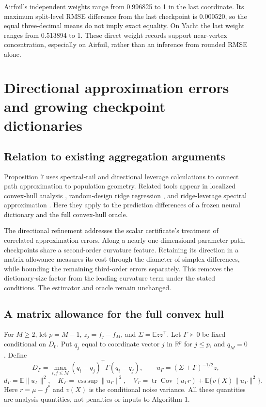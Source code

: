 \documentclass[pdflatex,sn-mathphys-ay]{sn-jnl}
\theoremstyle{remark}\newtheorem{remark}[theorem]{Remark}
\newcommand{\E}{\mathbb E}
\newcommand{\R}{\mathbb R}
\newcommand{\tr}{\operatorname{tr}}
\begin{document}
Airfoil's independent weights range from 0.996825 to 1 in the last coordinate. Its maximum split-level RMSE difference from the last checkpoint is 0.000520, so the equal three-decimal means do not imply exact equality. On Yacht the last weight ranges from 0.513894 to 1. These direct weight records support near-vertex concentration, especially on Airfoil, rather than an inference from rounded RMSE alone.

\section{Directional approximation errors and growing checkpoint dictionaries}\label{sec:directional}
\subsection{Relation to existing aggregation arguments}
Proposition 7 uses spectral-tail and directional leverage calculations to connect path approximation to population geometry. Related tools appear in localized convex-hull analysis \citep{belleclocal}, random-design ridge regression \citep{hsu}, and ridge-leverage spectral approximation \citep{cohen}. Here they apply to the prediction differences of a frozen neural dictionary and the full convex-hull oracle.

The directional refinement addresses the scalar certificate's treatment of correlated approximation errors. Along a nearly one-dimensional parameter path, checkpoints share a second-order curvature feature. Retaining its direction in a matrix allowance measures its cost through the diameter of simplex differences, while bounding the remaining third-order errors separately. This removes the dictionary-size factor from the leading curvature term under the stated conditions. The estimator and oracle remain unchanged.

\subsection{A matrix allowance for the full convex hull}
For $M\geq2$, let $p=M-1$, $z_j=f_j-f_M$, and $\Sigma=\E zz^\top$. Let $\Gamma\succ0$ be fixed conditional on $D_0$. Put $q_j$ equal to coordinate vector $j$ in $\R^p$ for $j\leq p$, and $q_M=0$. Define
\[
 D_\Gamma=\max_{i,j\leq M}(q_i-q_j)^\top\Gamma(q_i-q_j),\qquad
 u_\Gamma=(\Sigma+\Gamma)^{-1/2}z,
\]
\[
 d_\Gamma=\E\|u_\Gamma\|^2,\quad K_\Gamma=\mathop{\mathrm{ess\,sup}}\|u_\Gamma\|^2,\quad
 V_\Gamma=\tr\operatorname{Cov}(u_\Gamma r)+\E\{v(X)\|u_\Gamma\|^2\}.
\]
Here $r=\mu-f^*$ and $v(X)$ is the conditional noise variance. All these quantities are analysis quantities, not penalties or inputs to Algorithm 1.
\end{document}
